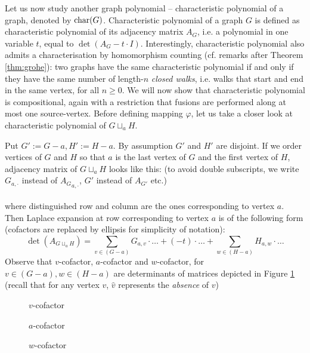 Let us now study another graph polynomial -- characteristic polynomial of a graph, denoted by $\operatorname{char}(G)$. Characteristic polynomial of a graph $G$ is defined as characteristic polynomial of its adjacency matrix $A_G$, i.e. a polynomial in one variable $t$, equal to $\det(A_G - t \cdot I)$. Interestingly, characteristic polynomial also admits a characterisation by homomorphism counting (cf. remarks after Theorem \ref{thm:grohe}): two graphs have the same characteristic polynomial if and only if they have the same number of length-$n$ \emph{closed walks}, i.e. walks that start and end in the same vertex, for all $n \geq 0$. We will now show that characteristic polynomial is compositional, again with a restriction that fusions are performed along at most one source-vertex. Before defining mapping $\varphi$, let us take a closer look at characteristic polynomial of $G \sqcup_a H$.

Put $G':= G-a, H':=H-a$. By assumption $G'$ and $H'$ are disjoint.
If we order vertices of $G$ and $H$ so that $a$ is the last vertex of $G$ and the first vertex of $H$, adjacency matrix of $G\sqcup_aH$ looks like this: (to avoid double subscripts, we write  $G_{a,\cdot}$ instead of ${A_G}_{a,\cdot}$, $G'$ instead of $A_{G'}$ etc.)\\
\scalebox{\skalamatadjacency}{

}
\\
where distinguished row and column are the ones corresponding to vertex $a$.
Then Laplace expansion at row corresponding to vertex $a$ is of the following form (cofactors are replaced by ellipsis for simplicity of notation):
\begin{equation*}
	\det(A_{G\sqcup_a H}) = \sum_{v \in (G-a)} G_{a, v} \cdot \ldots + (-t) \cdot \ldots + \sum_{w \in (H-a)} H_{a,w} \cdot \ldots
\end{equation*}
Observe that $v$-cofactor, $a$-cofactor and $w$-cofactor, for $v\in (G-a), w \in (H-a)$ are determinants of matrices depicted in Figure \ref{fig:kofaktory-adjacency-matrix} (recall that for any vertex $v$, $\widehat{v}$ represents the \emph{absence} of $v$)\\

\begin{figure}
	\label{fig:kofaktory-adjacency-matrix}
\scalebox{\skalamacierzy}{
	
}
	\caption{$v$-cofactor}

\scalebox{\skalamacierzy}{
	
}
	\caption{$a$-cofactor}
\scalebox{\skalamacierzy}{
	
}
	\caption{$w$-cofactor}

\end{figure}


